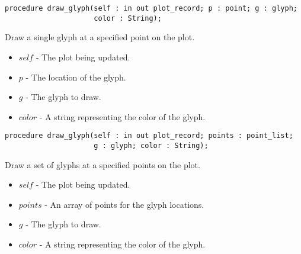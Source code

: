 \documentclass[10pt, openany]{book}
\begin{document}
\begin{lstlisting}
procedure draw_glyph(self : in out plot_record; p : point; g : glyph;
                     color : String);
\end{lstlisting}
Draw a single glyph at a specified point on the plot.
\begin{itemize}
  \item $self$ - The plot being updated.
  \item $p$ - The location of the glyph.
  \item $g$ - The glyph to draw.
  \item $color$ - A string representing the color of the glyph.
\end{itemize}
\begin{lstlisting}
procedure draw_glyph(self : in out plot_record; points : point_list;
                     g : glyph; color : String);
\end{lstlisting}
Draw a set of glyphs at a specified points on the plot.
\begin{itemize}
  \item $self$ - The plot being updated.
  \item $points$ - An array of points for the glyph locations.
  \item $g$ - The glyph to draw.
  \item $color$ - A string representing the color of the glyph.
\end{itemize}

\end{document}

